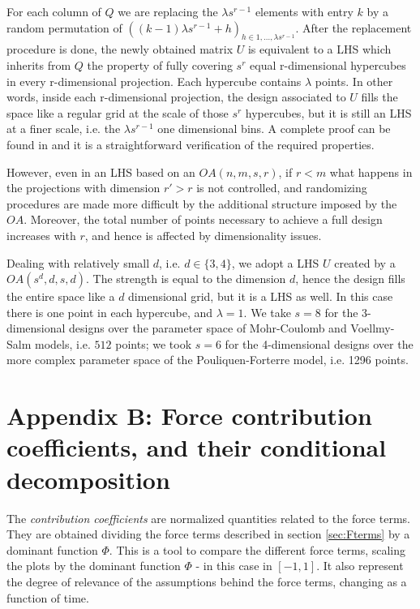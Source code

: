 \documentclass{article}
\begin{document}
For each column of $Q$ we are replacing the $\lambda s^{r-1}$ elements with entry $k$ by a random permutation of $\left((k-1)\lambda s^{r-1} + h\right)_{h\in 1,\dots, \lambda s^{r-1}}$. After the replacement procedure is done, the newly obtained matrix $U$ is equivalent to a LHS which inherits from $Q$ the property of fully covering $s^r$ equal r-dimensional hypercubes in every r-dimensional projection. Each hypercube contains $\lambda$ points. In other words, inside each r-dimensional projection, the design associated to $U$ fills the space like a regular grid at the scale of those $s^r$ hypercubes, but it is still an LHS at a finer scale, i.e. the $\lambda s^{r-1}$ one dimensional bins. A complete proof can be found in \cite{Tang1993} and it is a straightforward verification of the required properties.

However, even in an LHS based on an $OA(n,m,s,r)$, if $r<m$ what happens in the projections with dimension $r'>r$ is not controlled, and randomizing procedures are made more difficult by the additional structure imposed by the $OA$. Moreover, the total number of points necessary to achieve a full design increases with $r$, and hence is affected by dimensionality issues.

Dealing with relatively small $d$, i.e. $d\in\{3,4\}$, we adopt a LHS $U$ created by a $OA(s^d,d,s,d)$. The strength is equal to the dimension $d$, hence the design fills the entire space like a $d$ dimensional grid, but it is a LHS as well. In this case there is one point in each hypercube, and $\lambda=1$. We take $s=8$ for the 3-dimensional designs over the parameter space of Mohr-Coulomb and Voellmy-Salm models, i.e. $512$ points; we took $s=6$ for the 4-dimensional designs over the more complex parameter space of the Pouliquen-Forterre model, i.e. 1296 points.

\section{Appendix B: Force contribution coefficients, and their conditional decomposition}
The \emph{contribution coefficients} are normalized quantities related to the force terms. They are obtained dividing the force terms described in section \ref{sec:Fterms} by a dominant function $\Phi$. This is a tool to compare the different force terms, scaling the plots by the dominant function $\Phi$ - in this case in $[-1,1]$. It also represent the degree of relevance of the assumptions behind the force terms, changing as a function of time.
\end{document}
